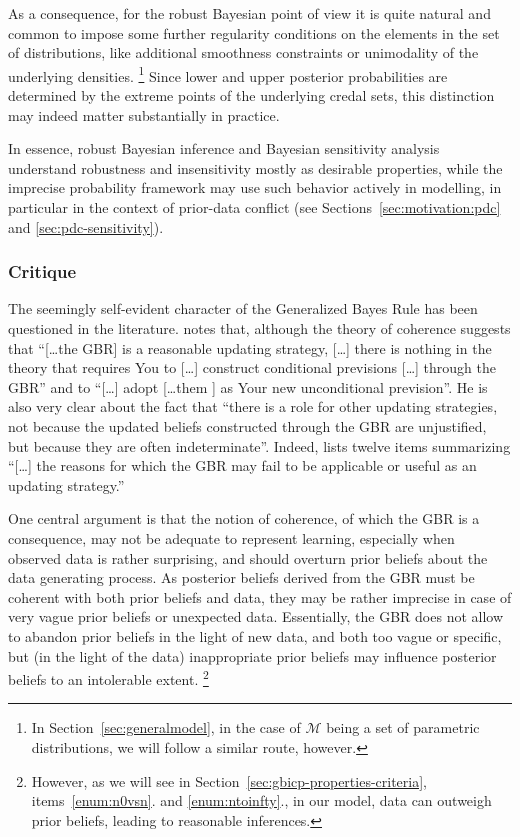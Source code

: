 As a consequence, for the robust Bayesian point of view it is quite natural and common
to impose some further regularity conditions on the elements in the set of distributions,
like additional smoothness constraints or unimodality of the underlying densities.%
\footnote{In Section~\ref{sec:generalmodel}, in the case of $\mathcal{M}$ being a set of parametric distributions,
we will follow a similar route, however.}
Since lower and upper posterior probabilities are determined by the extreme points of the underlying credal sets,
this distinction may indeed matter substantially in practice.

In essence, robust Bayesian inference and Bayesian sensitivity analysis
understand robustness and insensitivity mostly as desirable properties,
while the imprecise probability framework may use such behavior actively in modelling,
in particular in the context of prior-data conflict
(see Sections~\ref{sec:motivation:pdc} and \ref{sec:pdc-sensitivity}).

\subsubsection{Critique}
\label{sec:updating}


The seemingly self-evident character of the Generalized Bayes Rule has been questioned in the literature.
\Textcite[p.~335]{1991:walley} notes that, although the theory of coherence suggests that
``[\ldots the GBR] is a reasonable updating strategy,
[\ldots] there is nothing in the theory that requires You to [\ldots] construct conditional previsions [\ldots] through the GBR''
and to ``[\ldots] adopt [\ldots them ] as Your new unconditional prevision''.
He is also very clear about the fact \parencite[see][p.~334]{1991:walley} that
``there is a role for other updating strategies, not because the updated beliefs constructed through the GBR are unjustified,
but because they are often indeterminate''.
Indeed, \textcite[\S 6.11.1]{1991:walley} lists twelve items summarizing
``[\ldots] the reasons for which the GBR may fail to be applicable or useful as an updating strategy.''

One central argument is that the notion of coherence, of which the GBR is a consequence,
may not be adequate to represent learning, especially when observed data is rather surprising,
and should overturn prior beliefs about the data generating process.
As posterior beliefs derived from the GBR must be coherent with both prior beliefs and data,
they may be rather imprecise in case of very vague prior beliefs or unexpected data.
Essentially, the GBR does not allow to abandon prior beliefs in the light of new data,
and both too vague or specific, but (in the light of the data) inappropriate prior beliefs
may influence posterior beliefs to an intolerable extent.%
\footnote{However, as we will see in Section~\ref{sec:gbicp-properties-criteria},
items~\ref{enum:n0vsn}. and \ref{enum:ntoinfty}.,
in our model, data can outweigh prior beliefs,
leading to reasonable inferences.}


